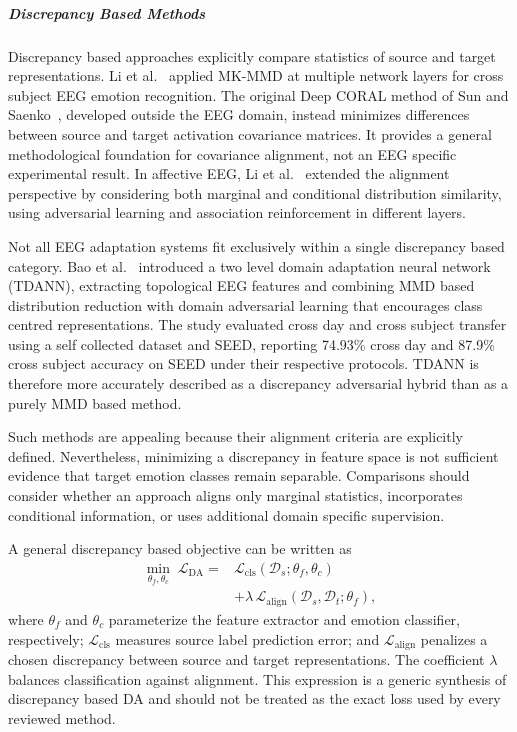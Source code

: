 \documentclass[ASNA,twocolumn]{USG}
\begin{document}
\subparagraph{Discrepancy Based Methods}

Discrepancy based approaches explicitly compare statistics of source and target representations. Li et al.~\cite{li2018cross} applied MK-MMD at multiple network layers for cross subject EEG emotion recognition. The original Deep CORAL method of Sun and Saenko~\cite{sun2016deep}, developed outside the EEG domain, instead minimizes differences between source and target activation covariance matrices. It provides a general methodological foundation for covariance alignment, not an EEG specific experimental result. In affective EEG, Li et al.~\cite{li2019domain} extended the alignment perspective by considering both marginal and conditional distribution similarity, using adversarial learning and association reinforcement in different layers.

Not all EEG adaptation systems fit exclusively within a single discrepancy based category. Bao et al.~\cite{bao2021two} introduced a two level domain adaptation neural network (TDANN), extracting topological EEG features and combining MMD based distribution reduction with domain adversarial learning that encourages class centred representations. The study evaluated cross day and cross subject transfer using a self collected dataset and SEED, reporting 74.93\% cross day and 87.9\% cross subject accuracy on SEED under their respective protocols. TDANN is therefore more accurately described as a discrepancy adversarial hybrid than as a purely MMD based method.

Such methods are appealing because their alignment criteria are explicitly defined. Nevertheless, minimizing a discrepancy in feature space is not sufficient evidence that target emotion classes remain separable. Comparisons should consider whether an approach aligns only marginal statistics, incorporates conditional information, or uses additional domain specific supervision.

A general discrepancy based objective can be written as
\begin{equation}
\begin{aligned}
\min_{\theta_f,\theta_c}\;\mathcal{L}_{\mathrm{DA}}
={}&\mathcal{L}_{\mathrm{cls}}(\mathcal{D}_{s};\theta_f,\theta_c)\\
&+\lambda\,\mathcal{L}_{\mathrm{align}}(\mathcal{D}_{s},\mathcal{D}_{t};\theta_f),
\end{aligned}
\label{eq:da_generic_subjectind}
\end{equation}
where $\theta_f$ and $\theta_c$ parameterize the feature extractor and emotion classifier, respectively; $\mathcal{L}_{\mathrm{cls}}$ measures source label prediction error; and $\mathcal{L}_{\mathrm{align}}$ penalizes a chosen discrepancy between source and target representations. The coefficient $\lambda$ balances classification against alignment. This expression is a generic synthesis of discrepancy based DA and should not be treated as the exact loss used by every reviewed method.
\end{document}
